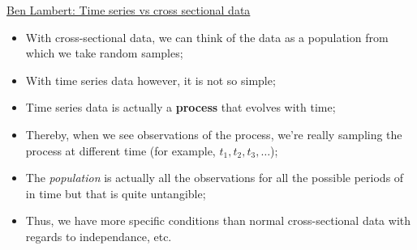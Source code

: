 \documentclass[12pt, titlepage, french]{report}
\begin{document}
\begin{YTB_SUMM}{\href{https://www.youtube.com/watch?v=-gmlyRRscXo}{Ben Lambert: Time series vs cross sectional data}}
\begin{minipage}{0.2\linewidth}
\end{minipage}
\begin{minipage}{0.8\linewidth}
\begin{itemize}
	\item	With cross-sectional data, we can think of the data as a population from which we take random samples;
	\item	With time series data however, it is not so simple;
	\item	Time series data is actually a \textbf{process} that evolves with time;
	\item	Thereby, when we see observations of the process, we're really sampling the process at different time (for example, $t_{1}, t_{2}, t_{3}, \dots$);
	\item	The \og \textit{population} \fg{} is actually all the observations for all the possible periods of in time but that is quite untangible;
	\item	Thus, we have more specific conditions than normal cross-sectional data with regards to independance, etc.
\end{itemize}   
\end{minipage}
\end{YTB_SUMM}
\end{document}

